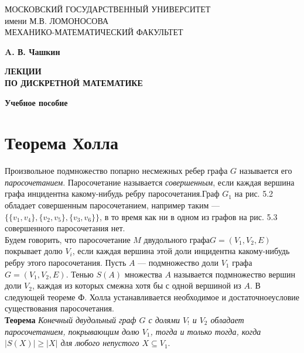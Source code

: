 \documentclass{article}
\numberwithin{equation}{section}
\begin{document}
    
    \begin{center}
        {\Large МОСКОВСКИЙ ГОСУДАРСТВЕННЫЙ УНИВЕРСИТЕТ\\
        имени М.В. ЛОМОНОСОВА\\
        МЕХАНИКО-МАТЕМАТИЧЕСКИЙ ФАКУЛЬТЕТ}
    \end{center} 
    
    \vspace{4cm}
    \begin{center}
        {\LARGE {\bf A. В. Чашкин}}
    \end{center}
    
    \begin{center}
        {\LARGE \bf{ЛЕКЦИИ\\
        ПО ДИСКРЕТНОЙ МАТЕМАТИКЕ}}
    \end{center}
    
    \begin{center}
         {\bf Учебное пособие}
    \end{center}
    \newpage
    
    \tableofcontents
    \newpage
    
    \section{Теорема Холла}
    Произвольное подмножество попарно несмежных ребер графа
    $G$ называется его \emph{паросочетанием}. Паросочетание называется \emph{совершенным}, если каждая вершина графа инцидентна какому-нибудь ребру паросочетания.Граф
    $G_1$ на рис. 5.2 обладает совершенным паросочетанием, например таким — $\{\{v_1, v_4\}, \{v_2, v_5\}, \{v_3, v_6\}\}$, в то время как ни в одном из графов на рис. 5.3 совершенного паросочетания нет.\\
    Будем говорить, что паросочетание $M$ двудольного графа$ G = (V_1, V_2, E)$ покрывает долю $V_i$, если каждая вершина этой доли инцидентна какому-нибудь ребру этого паросочетания. Пусть $A$ — подмножество доли $V_1$ графа $G = (V_1, V_2, E)$. Тенью $S(A)$ множества $A$ называется подмножество вершин доли $V_2$, каждая из которых смежна хотя бы с одной вершиной из $A$. В следующей теореме Ф. Холла устанавливается необходимое и достаточноеусловие существования паросочетания. \\
    
    \textbf{Теорема } {\it Конечный двудольный граф $G$ с долями $V_!$ и $V_2$ обладает паросочетанием, покрывающим долю $V_1$, тогда и только тогда, когда $ |S(X)| \ge |X| $ для любого непустого $X \subseteq V_1 .$}\\
    
\end{document}
